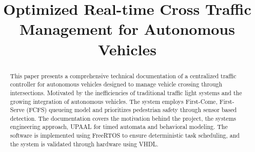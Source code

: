 \documentclass[conference]{IEEEtran}
\begin{document}
\title{Optimized Real-time Cross Traffic Management for Autonomous Vehicles\\
}

\author{
\and
{}
\and
{}
\and
{}

}

\maketitle

\begin{abstract}
This paper presents a comprehensive technical documentation of a centralized traffic controller for autonomous vehicles designed to manage vehicle crossing through intersections. Motivated by the inefficiencies of traditional traffic light systems and the growing integration of autonomous vehicles. The system employs First-Come, First-Serve (FCFS) queueing model and prioritizes pedestrian safety through sensor based detection. The documentation covers the motivation behind the project, the systems engineering approach, UPAAL for timed automata and behavioral modeling. The software is implemented using FreeRTOS to ensure deterministic task scheduling, and the system is validated through hardware using VHDL. 
\end{abstract}
\end{document}
